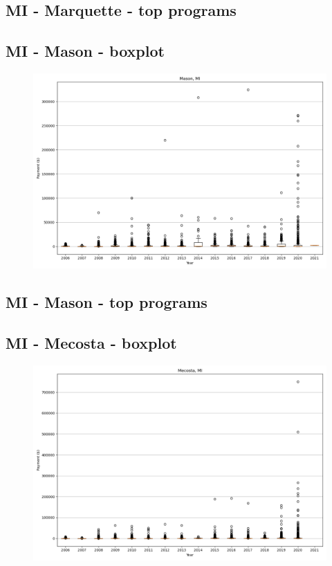 \subsection*{MI - Marquette - top programs}

\newpage
\subsection*{MI - Mason - boxplot}
\begin{figure}[h]
\centering
\includegraphics[width=7in]{../output/boxplots/counties/Mason-MI_boxplot.png}
\end{figure}


\subsection*{MI - Mason - top programs}

\newpage
\subsection*{MI - Mecosta - boxplot}
\begin{figure}[h]
\centering
\includegraphics[width=7in]{../output/boxplots/counties/Mecosta-MI_boxplot.png}
\end{figure}


